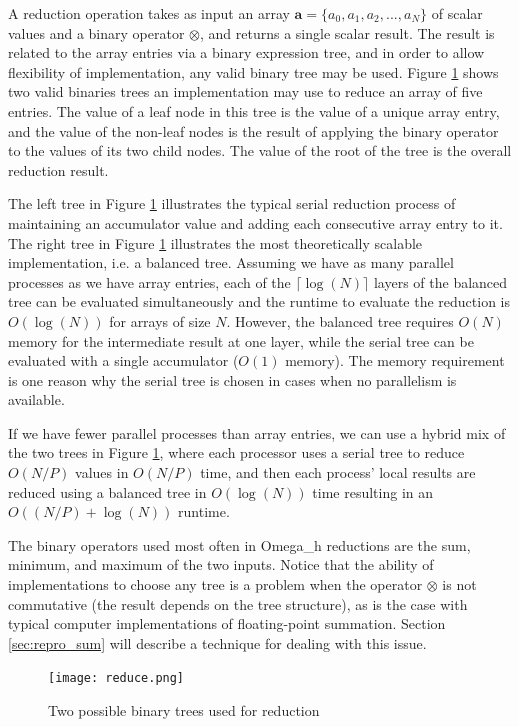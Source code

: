 A reduction operation takes as input an array
$\mathbf{a}=\{a_0,a_1,a_2,...,a_N\}$ of scalar values and
a binary operator $\otimes$, and returns a single scalar result.
The result is related to the array entries via a binary expression tree,
and in order to allow flexibility of implementation, any valid binary
tree may be used.
Figure \ref{fig:reduce} shows two valid binaries trees an implementation
may use to reduce an array of five entries.
The value of a leaf node in this tree is the value of a unique array entry,
and the value of the non-leaf nodes is the result of applying
the binary operator to the values of its two child nodes.
The value of the root of the tree is the overall reduction result.

The left tree in Figure \ref{fig:reduce} illustrates the typical
serial reduction process of maintaining an accumulator value and
adding each consecutive array entry to it.
The right tree in Figure \ref{fig:reduce} illustrates the most theoretically
scalable implementation, i.e. a balanced tree.
Assuming we have as many parallel processes as we have array entries,
each of the $\lceil\log(N)\rceil$ layers of the balanced tree
can be evaluated simultaneously and the
runtime to evaluate the reduction is $O(\log(N))$ for arrays of size $N$.
However, the balanced tree requires $O(N)$ memory for the intermediate
result at one layer, while the serial tree can be evaluated with
a single accumulator ($O(1)$ memory).
The memory requirement is one reason why the serial tree is chosen
in cases when no parallelism is available.

If we have fewer parallel processes than array entries, we can use a hybrid mix
of the two trees in Figure \ref{fig:reduce}, where each processor
uses a serial tree to reduce $O(N/P)$ values in $O(N/P)$ time, and
then each process' local results are reduced using a balanced tree
in $O(\log(N))$ time resulting in an $O((N/P)+\log(N))$ runtime.

The binary operators used most often in Omega\_h reductions
are the sum, minimum, and maximum of the two inputs.
Notice that the ability of implementations to choose any tree
is a problem when the operator $\otimes$ is not commutative
(the result depends on the tree structure),
as is the case with typical computer implementations of floating-point summation.
Section \ref{sec:repro_sum} will describe a technique for dealing
with this issue.

\begin{figure}
\begin{center}
\texttt{[image: reduce.png]}
\caption{Two possible binary trees used for reduction}
\label{fig:reduce}
\end{center}
\end{figure}

